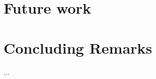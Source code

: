 \section{Future work}
\label{sec:conclusion:future}





\section{Concluding Remarks}
\label{sec:conclusion:remarks}
...
